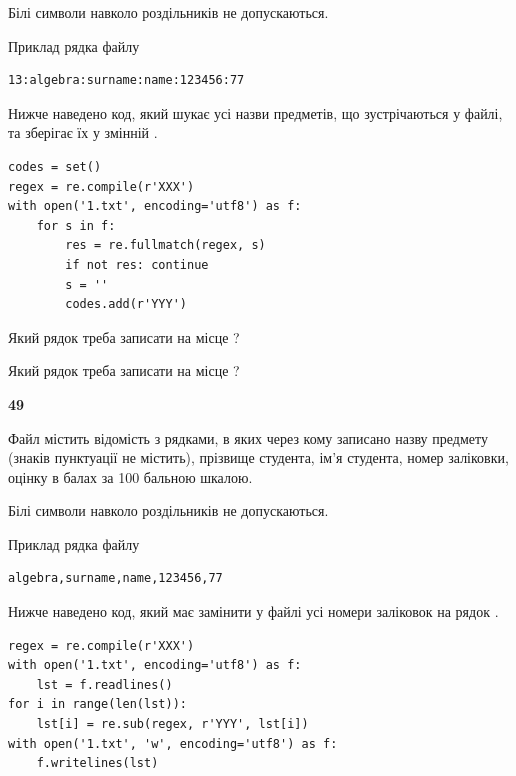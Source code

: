 Білі символи навколо роздільників не допускаються.

Приклад рядка файлу



\begin{verbatim}
13:algebra:surname:name:123456:77
\end{verbatim}


Нижче наведено код, який шукає усі назви предметів, що зустрічаються у файлі, та зберігає їх у змінній .



\begin{verbatim}
codes = set()
regex = re.compile(r'XXX')
with open('1.txt', encoding='utf8') as f:
    for s in f:
        res = re.fullmatch(regex, s)
        if not res: continue
        s = ''
        codes.add(r'YYY')
\end{verbatim}





Який рядок треба записати на місце  ?\par
\vspace{5mm}


Який рядок треба записати на місце  ?\par


\newpage

{\begin {center}\textbf{ 49}\end {center}}\par
Файл  містить відомість з рядками, в яких через кому записа\-но назву предмету (знаків пунктуації не містить), прізвище студента, ім'я студента, номер залі\-ков\-ки, оцінку в балах за 100 бальною шкалою.

Білі символи навколо роздільників не допускаються.

Приклад рядка файлу



\begin{verbatim}
algebra,surname,name,123456,77
\end{verbatim}


Нижче наведено код, який має замінити у файлі усі номери заліковок на рядок \code{***}.



\begin{verbatim}
regex = re.compile(r'XXX')
with open('1.txt', encoding='utf8') as f:
    lst = f.readlines()
for i in range(len(lst)):
    lst[i] = re.sub(regex, r'YYY', lst[i])
with open('1.txt', 'w', encoding='utf8') as f:
    f.writelines(lst)
\end{verbatim}







